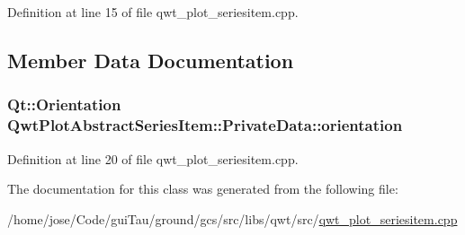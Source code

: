 Definition at line 15 of file qwt\-\_\-plot\-\_\-seriesitem.\-cpp.



\subsection{Member Data Documentation}
\hypertarget{class_qwt_plot_abstract_series_item_1_1_private_data_a5538d7f48458f836c7bf321307ba9d33}{
\subsubsection[{orientation}]{\setlength{\rightskip}{0pt plus 5cm}Qt\-::\-Orientation Qwt\-Plot\-Abstract\-Series\-Item\-::\-Private\-Data\-::orientation}}\label{class_qwt_plot_abstract_series_item_1_1_private_data_a5538d7f48458f836c7bf321307ba9d33}


Definition at line 20 of file qwt\-\_\-plot\-\_\-seriesitem.\-cpp.



The documentation for this class was generated from the following file\-:\begin{DoxyCompactItemize}
\item 
/home/jose/\-Code/gui\-Tau/ground/gcs/src/libs/qwt/src/\hyperlink{qwt__plot__seriesitem_8cpp}{qwt\-\_\-plot\-\_\-seriesitem.\-cpp}\end{DoxyCompactItemize}

